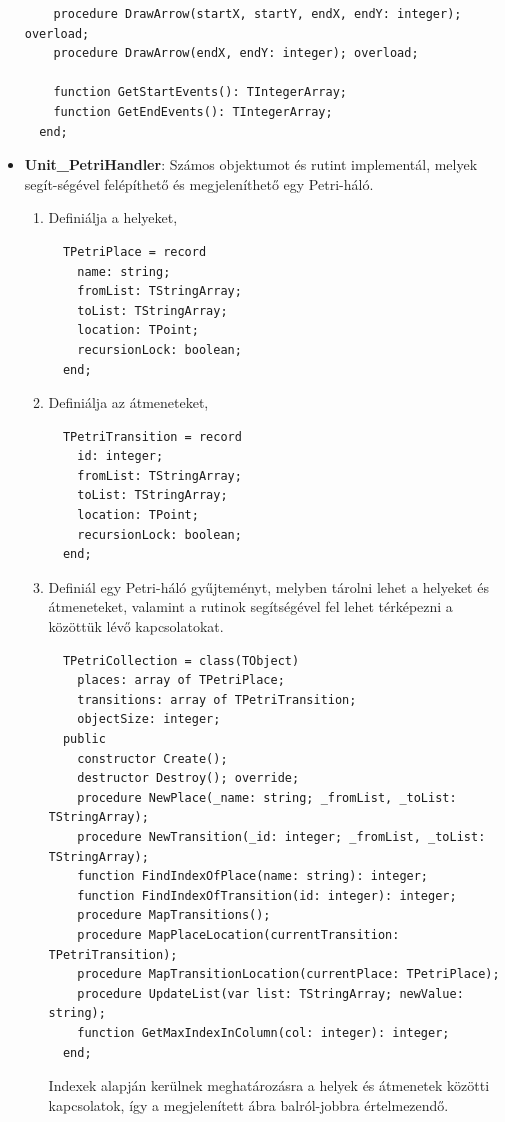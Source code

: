 \begin{itemize}
{\begin{lstlisting}
    procedure DrawArrow(startX, startY, endX, endY: integer); overload;
    procedure DrawArrow(endX, endY: integer); overload;

    function GetStartEvents(): TIntegerArray;
    function GetEndEvents(): TIntegerArray;
  end;

		\end{lstlisting}
	}
	\item{
		\textbf{Unit\_PetriHandler}: Számos objektumot és rutint implementál, melyek segít\hyp{}ségével felépíthető és megjeleníthető egy Petri-háló.
		\begin{enumerate}
			\item{Definiálja a helyeket,
				\begin{lstlisting}
  TPetriPlace = record
    name: string;
    fromList: TStringArray;
    toList: TStringArray;
    location: TPoint;
    recursionLock: boolean;
  end;
				\end{lstlisting}
			}
			\item{Definiálja az átmeneteket,
				\begin{lstlisting}
  TPetriTransition = record
    id: integer;
    fromList: TStringArray;
    toList: TStringArray;
    location: TPoint;
    recursionLock: boolean;
  end;
				\end{lstlisting}
			}
			\item{Definiál egy Petri-háló gyűjteményt, melyben tárolni lehet a helyeket és átmeneteket, valamint a rutinok segítségével fel lehet térképezni a közöttük lévő kapcsolatokat.
				\begin{lstlisting}
  TPetriCollection = class(TObject)
    places: array of TPetriPlace;
    transitions: array of TPetriTransition;
    objectSize: integer;
  public
    constructor Create();
    destructor Destroy(); override;
    procedure NewPlace(_name: string; _fromList, _toList: TStringArray);
    procedure NewTransition(_id: integer; _fromList, _toList: TStringArray);
    function FindIndexOfPlace(name: string): integer;
    function FindIndexOfTransition(id: integer): integer;
    procedure MapTransitions();
    procedure MapPlaceLocation(currentTransition: TPetriTransition);
    procedure MapTransitionLocation(currentPlace: TPetriPlace);
    procedure UpdateList(var list: TStringArray; newValue: string);
    function GetMaxIndexInColumn(col: integer): integer;
  end;
				\end{lstlisting}
 Indexek alapján kerülnek meghatározásra a helyek és átmenetek közötti kapcsolatok, így a megjelenített ábra balról-jobbra értelmezendő.
			}
		\end{enumerate}
	}
\end{itemize}























